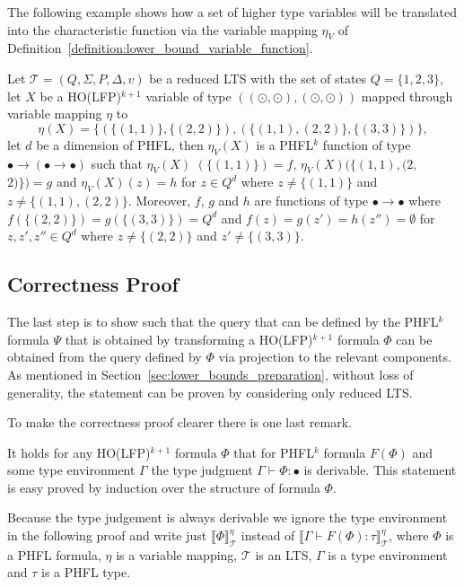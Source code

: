 The following example shows how a set of higher type variables will be translated into the characteristic function via the
variable mapping $\eta_V$ of Definition~\ref{definition:lower_bound_variable_function}.

\begin{example}
    Let $\mathcal{T} = (Q, \Sigma, P, \Delta, v)$ be a reduced LTS with the set of states $Q = \{1, 2, 3\}$, let $X$ be a HO(LFP)$^{k + 1}$
    variable of type $((\odot, \odot), (\odot, \odot))$ mapped through variable mapping $\eta$ to
    \[\eta(X) = \{(\{(1, 1)\}, \{(2, 2)\}), (\{(1, 1), (2, 2)\}, \{(3, 3)\})\},\]
    let $d$ be a dimension of PHFL, then $\eta_V(X)$ is a PHFL$^k$ function of type $\bullet \rightarrow (\bullet \rightarrow \bullet)$ such
    that $\eta_V(X)$ $(\{(1, 1)\}) = f$, $\eta_V(X)(\{(1, 1), (2, $ $2)\}) = g$ and $\eta_V(X)(z) = h$ for $z \in
    Q^d$ where $z \neq \{(1, 1)\}$ and $z \neq \{(1, 1), (2, 2)\}$. Moreover, $f$, $g$ and $h$ are functions of type $\bullet
    \rightarrow \bullet$ where $f(\{(2, 2)\}) = g(\{(3, 3)\}) = Q^d$ and $f(z) = g(z') = h(z'') = \emptyset$ for $z,
    z', z'' \in Q^d$ where $z \neq \{(2, 2)\}$ and $z' \neq \{(3, 3)\}$.
\end{example}

\subsection{Correctness Proof}\label{subsec:lower_bounds_correctness_lfp}

The last step is to show such that the query that can be defined by the PHFL$^k$ formula $\Psi$ that is obtained by transforming a HO(LFP)$^{k+1}$ formula $\Phi$ can be obtained from the query defined by $\Phi$ via projection to the relevant components. As mentioned in Section~\ref{sec:lower_bounds_preparation}, without loss of generality, the statement can be proven by considering only reduced LTS. 

To make the correctness proof clearer there is one last remark.

\begin{remark}
    It holds for any HO(LFP)$^{k+1}$ formula $\Phi$ that for PHFL$^k$ formula $F(\Phi)$ and some type environment $\Gamma$ the type judgment $\Gamma \vdash
    \Phi \colon \bullet$ is derivable. This statement
    is easy proved by induction over the structure of formula $\Phi$. 
\end{remark}

Because the type judgement is always derivable we ignore the type environment in the following proof and write just $\llbracket \Phi \rrbracket^\eta_\mathcal{T}$ instead of $\llbracket \Gamma \vdash F(\Phi) \colon \tau \rrbracket^\eta_\mathcal{T}$, where $\Phi$ is a PHFL formula, $\eta$ is a variable mapping, $\mathcal{T}$ is an LTS, $\Gamma$ is a type environment and $\tau$ is a PHFL type.

